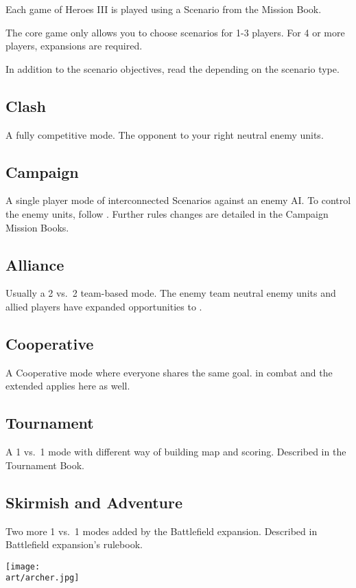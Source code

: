 
\begin{multicols*}{2}

Each game of Heroes III is played using a Scenario from the Mission Book.\par 
The core game only allows you to choose scenarios for 1-3 players. For 4 or more players, expansions are required.\par
In addition to the scenario objectives, read the  depending on the scenario type.

\subsection*{Clash}
A fully competitive mode. The opponent to your right  neutral enemy units.

\subsection*{Campaign}
A single player mode of interconnected Scenarios against an enemy AI.
To control the enemy units, follow .
Further rules changes are detailed in the Campaign Mission Books.

\subsection*{Alliance}
Usually a 2 vs.~2 team-based mode. The enemy team  neutral enemy units and allied players have expanded opportunities to . 

\subsection*{Cooperative}
A Cooperative mode where everyone shares the same goal.  in combat and the extended  applies here as well.

\subsection*{Tournament}
A 1 vs.~1 mode with different way of building map and scoring. Described in the Tournament Book.

\subsection*{Skirmish and Adventure}
Two more 1 vs.~1 modes added by the Battlefield expansion. Described in Battlefield expansion's rulebook.

\vspace*{\fill}

\columnbreak

\texttt{[image: \\art/archer.jpg]}

\end{multicols*}
